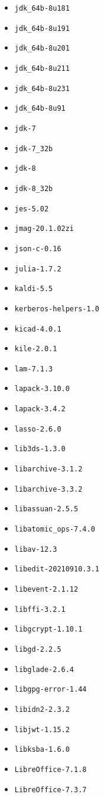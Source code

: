\begin{multicols}{3}
\begin{itemize}
\item \verb|jdk_64b-8u181|
\item \verb|jdk_64b-8u191|
\item \verb|jdk_64b-8u201|
\item \verb|jdk_64b-8u211|
\item \verb|jdk_64b-8u231|
\item \verb|jdk_64b-8u91|
\item \verb|jdk-7|
\item \verb|jdk-7_32b|
\item \verb|jdk-8|
\item \verb|jdk-8_32b|
\item \verb|jes-5.02|
\item \verb|jmag-20.1.02zi|
\item \verb|json-c-0.16|
\item \verb|julia-1.7.2|
\item \verb|kaldi-5.5|
\item \verb|kerberos-helpers-1.0|
\item \verb|kicad-4.0.1|
\item \verb|kile-2.0.1|
\item \verb|lam-7.1.3|
\item \verb|lapack-3.10.0|
\item \verb|lapack-3.4.2|
\item \verb|lasso-2.6.0|
\item \verb|lib3ds-1.3.0|
\item \verb|libarchive-3.1.2|
\item \verb|libarchive-3.3.2|
\item \verb|libassuan-2.5.5|
\item \verb|libatomic_ops-7.4.0|
\item \verb|libav-12.3|
\item \verb|libedit-20210910.3.1|
\item \verb|libevent-2.1.12|
\item \verb|libffi-3.2.1|
\item \verb|libgcrypt-1.10.1|
\item \verb|libgd-2.2.5|
\item \verb|libglade-2.6.4|
\item \verb|libgpg-error-1.44|
\item \verb|libidn2-2.3.2|
\item \verb|libjwt-1.15.2|
\item \verb|libksba-1.6.0|
\item \verb|LibreOffice-7.1.8|
\item \verb|LibreOffice-7.3.7|

\end{itemize}
\end{multicols}
